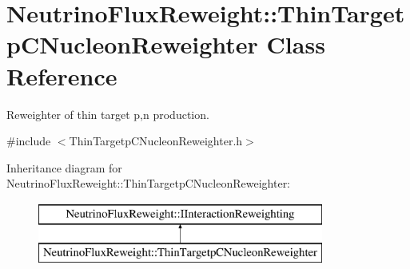 \hypertarget{class_neutrino_flux_reweight_1_1_thin_targetp_c_nucleon_reweighter}{\section{Neutrino\-Flux\-Reweight\-:\-:Thin\-Targetp\-C\-Nucleon\-Reweighter Class Reference}
\label{class_neutrino_flux_reweight_1_1_thin_targetp_c_nucleon_reweighter}
}


Reweighter of thin target p,n production.  




{\ttfamily \#include $<$Thin\-Targetp\-C\-Nucleon\-Reweighter.\-h$>$}

Inheritance diagram for Neutrino\-Flux\-Reweight\-:\-:Thin\-Targetp\-C\-Nucleon\-Reweighter\-:\begin{figure}[H]
\begin{center}
\leavevmode
\includegraphics[height=2.000000cm]{class_neutrino_flux_reweight_1_1_thin_targetp_c_nucleon_reweighter}
\end{center}
\end{figure}
